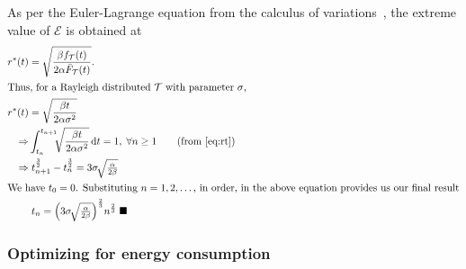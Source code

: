 As per the Euler-Lagrange equation from the calculus of variations~\cite{bellman1954dynamic,arfken2013calculus}, the extreme value of $\mathcal{E}$ is obtained at
\begin{alignat}{1}
r^*(t)&=\sqrt{\dfrac{\beta f_\mathcal{T}(t)}{2\alpha\bar{F}_\mathcal{T}(t)}}.\\
\intertext{Thus, for a Rayleigh distributed $\mathcal{T}$ with parameter $\sigma$,}
r^*(t)&=\sqrt{\dfrac{\beta t}{2\alpha\sigma^2}}\\
\Rightarrow &\int_{t_n}^{t_{n+1}}\!\!\!\sqrt{\dfrac{\beta t}{2\alpha\sigma^2}}\,\mathrm{d}t=1,\;\forall n\geq1\nonumber\tag{from \eqref{eq:rt}}\\
\Rightarrow &\;t_{n+1}^{\frac{3}{2}}-t_{n}^{\frac{3}{2}}=3\sigma\!\sqrt{\tfrac{\alpha}{2\beta}}\nonumber\\
\intertext{We have $t_0=0$. Substituting $n=1,2,\dots$, in order, in the above equation provides us our final result}
&\;t_n=\Big(3\sigma\!\sqrt{\tfrac{\alpha}{2\beta}}\Big)^{\frac{2}{3}}n^{\frac{2}{3}}\;\blacksquare\label{eq:tnRayleigh}
\end{alignat}


\subsubsection{Optimizing for energy consumption}


